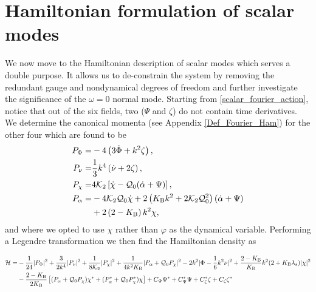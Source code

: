 \documentclass[twocolumn,prd,preprintnumbers,amsmath,amssymb,nofootinbib,superscriptaddress]{revtex4-1}
\newcommand{\lambdas}{\lambda_s}
\newcommand{\momentum}[3]{ {#1_{#2}}}
\newcommand{\Kcal}{{\cal K}}
\newcommand{\Qcal}{{\cal Q}}
\newcommand{\Hcal}{{\cal H}}
\newcommand{\Gt}{\ensuremath{\tilde{G}}}
\newcommand{\KB}{\ensuremath{K_{{\rm B}}}}
\begin{document}
\section{Hamiltonian formulation of scalar modes}
\label{Sec_Ham}
We now move to the Hamiltonian description of scalar modes which serves a double purpose. 
It allows us to de-constrain the system by removing the redundant gauge and nondynamical degrees of freedom and 
further investigate the significance of the $\omega=0$ normal mode. Starting from \eqref{scalar_fourier_action}, notice that out of the six fields, two ($\Psi$ and $\zeta$) do not contain time derivatives.
We determine the canonical momenta (see  Appendix \ref{Def_Fourier_Ham})
for the other four which are found to be
\begin{align}
\momentum{P}{\Phi}{k} =& -4 \left( 3 \dot{\Phi} +  k^2   \zeta \right),
\label{Momentum_P_Phi}
\\
\momentum{P}{\nu}{k} 
 =& \frac{1}{3}  k^4 \left(\dot{\nu} + 2 \zeta\right),
\\
\momentum{P}{\chi}{k}  =& 4  \Kcal_2 \left[\dot{\chi}  - \Qcal_0(\dot{\alpha} +   \Psi) \right],
\\
\momentum{P}{\alpha}{k}  =& 
 -4 \Kcal_2 \Qcal_0 \dot{\chi}  
 + 2 \left( \KB k^2  + 2 \Kcal_2 \Qcal_0^2 \right)  \left(\dot{\alpha} + \Psi\right)
\nonumber
\\
& 
+ 2\left(2 - \KB\right)   k^2 \chi,
\end{align}
and where we opted to use $\chi$ rather than $\varphi$ as the dynamical variable.
Performing a Legendre transformation we then find the Hamiltonian density as
\begin{widetext}
\begin{align}
\Hcal =&  
-\frac{1}{24} |P_\Phi|^2
+ \frac{3}{2k^4} |P_\nu|^2
+ \frac{1}{8\Kcal_2} |P_\chi|^2
+ \frac{1}{4k^2 \KB}   | P_\alpha + \Qcal_0 P_\chi |^2 
- 2 k^2   |\Phi - \frac{1}{6}k^2 \nu|^2
+ \frac{2-\KB}{\KB}  k^2 (2+\KB \lambdas) |\chi|^2
\nonumber
\\
&
- \frac{2-\KB}{2\KB} \left[(P_\alpha + \Qcal_0 P_\chi ) \chi^*  + ( P_\alpha^* + \Qcal_0 P_\chi^*   )    \chi\right]
+ C_\Psi  \Psi^*
+ C_\Psi^*  \Psi
+ C_\zeta^*  \zeta
+ C_\zeta  \zeta^* 
\label{scalar_Hamiltonian}
\end{align}
\end{widetext}
\end{document}
